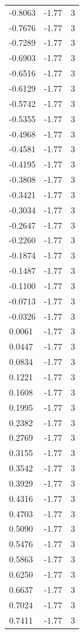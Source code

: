 \begin{longtable}{lrr}
  -0.8063 & -1.77 & 3 \\
  -0.7676 & -1.77 & 3 \\
  -0.7289 & -1.77 & 3 \\
  -0.6903 & -1.77 & 3 \\
  -0.6516 & -1.77 & 3 \\
  -0.6129 & -1.77 & 3 \\
  -0.5742 & -1.77 & 3 \\
  -0.5355 & -1.77 & 3 \\
  -0.4968 & -1.77 & 3 \\
  -0.4581 & -1.77 & 3 \\
  -0.4195 & -1.77 & 3 \\
  -0.3808 & -1.77 & 3 \\
  -0.3421 & -1.77 & 3 \\
  -0.3034 & -1.77 & 3 \\
  -0.2647 & -1.77 & 3 \\
  -0.2260 & -1.77 & 3 \\
  -0.1874 & -1.77 & 3 \\
  -0.1487 & -1.77 & 3 \\
  -0.1100 & -1.77 & 3 \\
  -0.0713 & -1.77 & 3 \\
  -0.0326 & -1.77 & 3 \\
  0.0061 & -1.77 & 3 \\
  0.0447 & -1.77 & 3 \\
  0.0834 & -1.77 & 3 \\
  0.1221 & -1.77 & 3 \\
  0.1608 & -1.77 & 3 \\
  0.1995 & -1.77 & 3 \\
  0.2382 & -1.77 & 3 \\
  0.2769 & -1.77 & 3 \\
  0.3155 & -1.77 & 3 \\
  0.3542 & -1.77 & 3 \\
  0.3929 & -1.77 & 3 \\
  0.4316 & -1.77 & 3 \\
  0.4703 & -1.77 & 3 \\
  0.5090 & -1.77 & 3 \\
  0.5476 & -1.77 & 3 \\
  0.5863 & -1.77 & 3 \\
  0.6250 & -1.77 & 3 \\
  0.6637 & -1.77 & 3 \\
  0.7024 & -1.77 & 3 \\
  0.7411 & -1.77 & 3 \\

\end{longtable}
